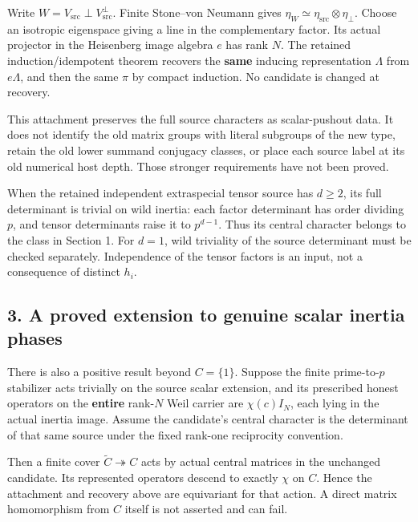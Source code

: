 Write \(W=V_{\mathrm{src}}\perp V_{\mathrm{src}}^\perp\). Finite
Stone--von Neumann gives
\(\eta_W\simeq\eta_{\mathrm{src}}\otimes\eta_\perp\). Choose an
isotropic eigenspace giving a line in the complementary factor. Its actual projector in the Heisenberg image algebra \(e\) has rank \(N\). The
retained induction/idempotent theorem recovers the \textbf{same}
inducing representation \(\Lambda\) from \(e\Lambda\), and then the same
\(\pi\) by compact induction. No candidate is changed at recovery.

This attachment preserves the full source characters as scalar-pushout
data. It does not identify the old matrix groups with literal subgroups
of the new type, retain the old lower summand conjugacy classes, or
place each source label at its old numerical host depth. Those stronger
requirements have not been proved.

When the retained independent extraspecial tensor source has \(d\ge2\),
its full determinant is trivial on wild inertia: each factor determinant
has order dividing \(p\), and tensor determinants raise it to
\(p^{d-1}\). Thus its central character belongs to the class in Section
1. For \(d=1\), wild triviality of the source determinant must be
checked separately. Independence of the tensor factors is an input, not
a consequence of distinct \(h_i\).

\hypertarget{odd_synthesis-a-proved-extension-to-genuine-scalar-inertia-phases}{%
\subsection{3. A proved extension to genuine scalar inertia
phases}\label{odd_synthesis-a-proved-extension-to-genuine-scalar-inertia-phases}}

There is also a positive result beyond \(C=\{1\}\). Suppose the finite
prime-to-\(p\) stabilizer acts trivially on the source scalar extension,
and its prescribed honest operators on the \textbf{entire} rank-\(N\)
Weil carrier are \(\chi(c)I_N\), each lying in the actual inertia image.
Assume the candidate's central character is the determinant of that same
source under the fixed rank-one reciprocity convention.

Then a finite cover \(\widetilde C\twoheadrightarrow C\) acts by actual
central matrices in the unchanged candidate. Its represented operators
descend to exactly \(\chi\) on \(C\). Hence the attachment and recovery
above are equivariant for that action. A direct matrix homomorphism from
\(C\) itself is not asserted and can fail.

